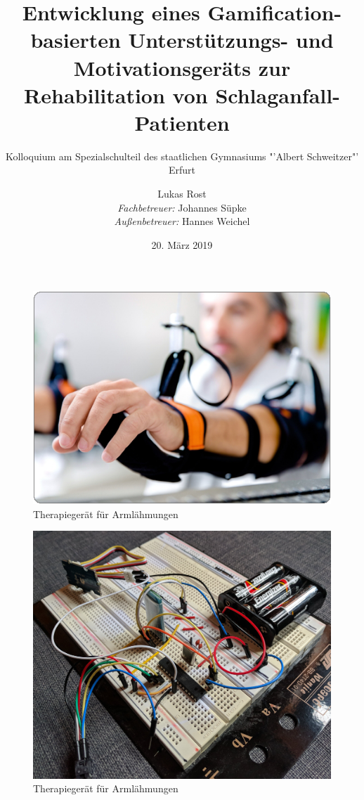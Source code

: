 \documentclass[hyphens]{beamer}
\begin{document}
  \title[Gerät zur Schlaganfall-Rehabilitation]{\LARGE{Entwicklung eines Gamification-basierten Unterstützungs- und Motivationsgeräts zur Rehabilitation von Schlaganfall-Patienten}}
  \subtitle{Kolloquium am Spezialschulteil des staatlichen Gymnasiums "'Albert Schweitzer"' Erfurt}
  \author[Lukas Rost]{Lukas Rost \\ \emph{Fachbetreuer:} Johannes Süpke \\ \emph{Außenbetreuer:} Hannes Weichel}
  \date{20. März 2019}


 \titlepage
 
 \begin{frame}
 \begin{figure}
 	\includegraphics[scale=0.4]{pics/einleit1}
 	\caption{Therapiegerät für Armlähmungen}
 \end{figure}
\end{frame}

  \begin{frame}
\begin{figure}
\includegraphics[scale=0.06]{pics/mikro}
  \caption{Therapiegerät für Armlähmungen}
\end{figure}
 \end{frame}
\end{document}
